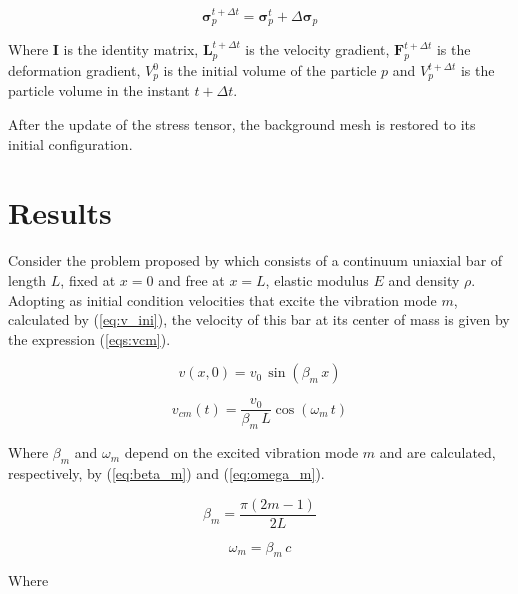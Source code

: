 \documentclass[preprint,12pt]{elsarticle}
\begin{document}
	\begin{equation}
	    \boldsymbol{\sigma}_p^{t+\Delta t}=\boldsymbol{\sigma}_p^t + \Delta \boldsymbol{\sigma}_p
        \label{eq:sigma}
	\end{equation}
	
	\noindent Where $\textbf{I}$ is the identity matrix, $\textbf{L}_p^{t+\Delta t}$ is the velocity gradient, $\textbf{F}_p^{t+\Delta t}$ is the deformation gradient, $V_p^0$ is the initial volume of the particle $p$ and $V_p^{t+\Delta t}$ is the particle volume in the instant $t+\Delta t$.
	
	After the update of the stress tensor, the background mesh is restored to its initial configuration.

	\section{Results}
	    Consider the problem proposed by \cite{bardenhagen_energy_2002} which consists of a continuum uniaxial bar of length $L$, fixed at $x=0$ and free at $x=L$, elastic modulus $E$ and density $\rho $. Adopting as initial condition velocities that excite the vibration mode $m$, calculated by (\ref{eq:v_ini}), the velocity of this bar at its center of mass is given by the expression (\ref{eqs:vcm}).
	    
	    \begin{equation}
	        v(x,0)=v_0\,\sin(\beta_m\,x)
	        \label{eq:v_ini}
	    \end{equation}
	    
	    \begin{equation}
		    v_{cm}(t)=\frac{v_{0}}{\beta_{m}\,L}\cos(\omega_{m}\,t)
		    \label{eqs:vcm}
	    \end{equation}
	    
	    \noindent Where $\beta_m$ and $\omega_m$ depend on the excited vibration mode $m$ and are calculated, respectively, by (\ref{eq:beta_m}) and (\ref{eq:omega_m}).
	    
	    \begin{equation}
		    \beta_{m}=\frac{\pi(2m-1)}{2L}	
		    \label{eq:beta_m}
	    \end{equation}
	    
        \begin{equation}
            \omega_m=\beta_m\,c
            \label{eq:omega_m}
        \end{equation}
        
        \noindent Where 
        
\end{document}
